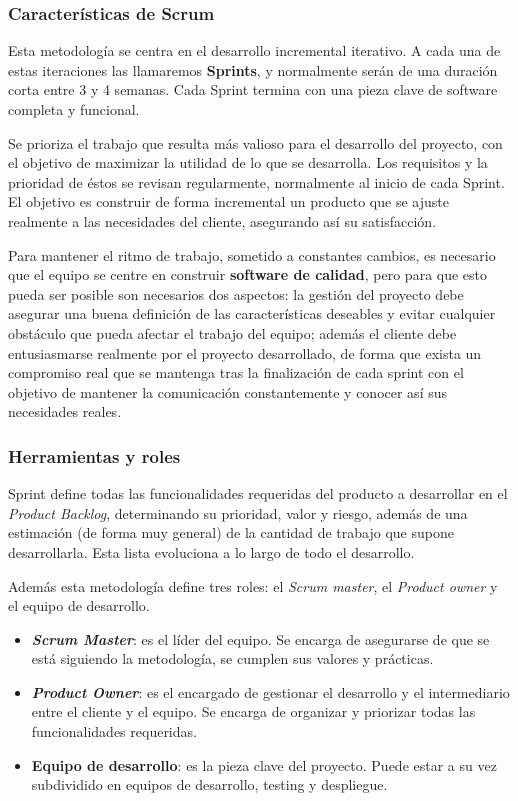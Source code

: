 \subsubsection{Características de Scrum}
Esta metodología se centra en el desarrollo incremental iterativo. A cada una de estas iteraciones las llamaremos \textbf{Sprints}, y normalmente serán de una duración corta entre 3 y 4 semanas. Cada Sprint termina con una pieza clave de software completa y funcional.

Se prioriza el trabajo que resulta más valioso para el desarrollo del proyecto, con el objetivo de maximizar la utilidad de lo que se desarrolla. Los requisitos y la prioridad de éstos se revisan regularmente, normalmente al inicio de cada Sprint. El objetivo es construir de forma incremental un producto que se ajuste realmente a las necesidades del cliente, asegurando así su satisfacción.

Para mantener el ritmo de trabajo, sometido a constantes cambios, es necesario que el equipo se centre en construir \textbf{software de calidad}, pero para que esto pueda ser posible son necesarios dos aspectos: la gestión del proyecto debe asegurar una buena definición de las características deseables y evitar cualquier obstáculo que pueda afectar el trabajo del equipo; además el cliente debe entusiasmarse realmente por el proyecto desarrollado, de forma que exista un compromiso real que se mantenga tras la finalización de cada sprint con el objetivo de mantener la comunicación constantemente y conocer así sus necesidades reales.

\subsubsection{Herramientas y roles}
Sprint define todas las funcionalidades requeridas del producto a desarrollar en el \textit{Product Backlog}, determinando su prioridad, valor y riesgo, además de una estimación (de forma muy general) de la cantidad de trabajo que supone desarrollarla. Esta lista evoluciona a lo largo de todo el desarrollo.
		
		Además esta metodología define tres roles: el \textit{Scrum master}, el \textit{Product owner} y el equipo de desarrollo.
			\begin{itemize}
				\item \textbf{\textit{Scrum Master}}: es el líder del equipo. Se encarga de asegurarse de que se está siguiendo la metodología, se cumplen sus valores y prácticas. 
				\item \textbf{\textit{Product Owner}}: es el encargado de gestionar el desarrollo y el intermediario entre el cliente y el equipo. Se encarga de organizar y priorizar todas las funcionalidades requeridas.
				\item \textbf{Equipo de desarrollo}: es la pieza clave del proyecto. Puede estar a su vez subdividido en equipos de desarrollo, testing y despliegue. 
			\end{itemize}
